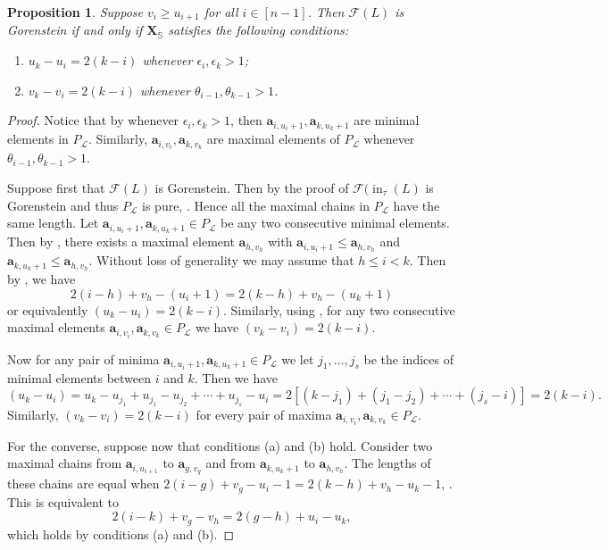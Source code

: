 \documentclass[11pt,a4paper,reqno,dvipsnames]{amsart}
\theoremstyle{plain}
\newtheorem{Proposition}[Theorem]{Proposition}
\theoremstyle{definition}
\newtheorem{Assumptions and Discussion}[Theorem]{Assumptions and Discussion}
\theoremstyle{remark}
\def\ini{\operatorname{in}}
\newcommand\bda{{\bm a}}
\newcommand\bfX{\mathbf{X}}
\newcommand\bfS{\mathbb{S}}
\newcommand\calF{\mathcal{F}}
\newcommand\calL{\mathcal{L}}
\begin{document}
\begin{Proposition} \label{Thm: Gor1}
 Suppose  $v_{i} \ge u_{i+1}$ for all $i \in [n-1]$. Then 
    $\calF(L)$ is Gorenstein if and only if $\bfX_{\bfS}$ satisfies the following conditions:
    \begin{enumerate}[a]
\item $u_k-u_i = 2(k-i)$
whenever $\epsilon_i, \epsilon_k >1$;

\item $v_k-v_i = 2(k-i)$ whenever  $\theta_{i-1}, \theta_{k-1} >1$. 
    \end{enumerate}
\end{Proposition}
\begin{proof}
Notice that by  whenever $\epsilon_i, \epsilon_k >1$, then $\bda_{i,u_i+1}, \bda_{k,u_k+1}$ are minimal elements in $P_{\calL}$. Similarly, $\bda_{i,v_i}, \bda_{k,v_k}$ are maximal elements of $P_{\calL}$ whenever $\theta_{i-1}, \theta_{k-1}>1$. 


 Suppose first that $\calF(L)$ is Gorenstein. Then 
 by the proof of  $\calF(\ini_{\tau}(L)$ is Gorenstein and thus $P_{\calL}$ is pure, \cite{HibiDistLatt}. Hence all the maximal chains in $P_{\calL}$ have the same length.
 Let  $\bda_{i, u_i+1}, \bda_{k,u_k+1}\in P_\calL$  be any two consecutive minimal elements. Then by , there exists a maximal element $\bda_{h,v_h}$ with $\bda_{i, u_i+1}\le \bda_{h,v_h}$ and $ \bda_{k,u_k+1}\le \bda_{h,v_h}$. Without loss of generality we may assume that  $h\le i<k$. Then by , we have $$2(i-h)+v_h-(u_i+1)=2(k-h)+v_h-(u_k+1)$$ or equivalently $(u_k-u_i) = 2(k-i)$. Similarly, using , for any two consecutive maximal elements $\bda_{i, v_i}, \bda_{k,v_k}\in P_\calL$  we have $(v_k-v_i) = 2(k-i)$.
 
 Now for any pair of  minima $\bda_{i, u_i+1}, \bda_{k,u_k+1}\in P_\calL$ we let $j_1,\ldots, j_s$ be the indices of  minimal elements between $i$ and $k$. Then we have $$(u_k-u_i) =u_k-u_{j_1}+u_{j_1}-u_{j_2}+\cdots+u_{j_s}-u_i=2[(k-j_1)+(j_1-j_2)+\cdots+(j_s-i)]=2(k-i).$$ Similarly, $(v_k-v_i) = 2(k-i)$ for every pair of maxima $\bda_{i, v_i}, \bda_{k,v_k}\in P_\calL$.
 
For the converse, suppose now that conditions (a) and (b) hold. Consider two maximal chains  from $\bda_{i,u_{i+1}}$ to $\bda_{g,v_g}$ and  from $\bda_{k,u_k+1}$ to $\bda_{h,v_h}$.  The lengths of these chains are equal when $2(i-g)+v_g-u_i-1=2(k-h)+v_h-u_k-1$, . This is equivalent to $$2(i-k)+v_g-v_h=2(g-h)+u_i-u_k,$$ which holds by conditions (a) and (b).
\end{proof}
\end{document}
